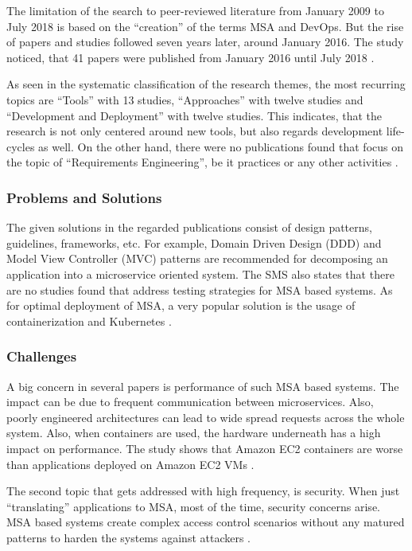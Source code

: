 The limitation of the search to peer-reviewed literature from January 2009 to
July 2018 is based on the ``creation'' of the terms MSA and DevOps.
But the rise of papers and studies followed seven years later, around January 2016.
The study noticed, that 41 papers were published from January 2016 until July 2018
\cite{waseem:SMSMSADevOps}.

As seen in the systematic classification of the research themes, the most recurring
topics are ``Tools'' with 13 studies, ``Approaches'' with twelve studies and
``Development and Deployment'' with twelve studies. This indicates, that the research
is not only centered around new tools, but also regards development life-cycles
as well. On the other hand, there were no publications found that focus on
the topic of ``Requirements Engineering'', be it practices or any other
activities \cite{waseem:SMSMSADevOps}.

\subsubsection{Problems and Solutions}

The given solutions in the regarded publications consist of
design patterns, guidelines, frameworks, etc. For example,
Domain Driven Design (DDD) and Model View Controller (MVC) patterns
are recommended for decomposing an application into a microservice oriented
system. The SMS also states that there are no studies found that
address testing strategies for MSA based systems. As for optimal deployment
of MSA, a very popular solution is the usage of containerization and Kubernetes
\cite{waseem:SMSMSADevOps}.

\subsubsection{Challenges}

A big concern in several papers is performance of such MSA based systems.
The impact can be due to frequent communication between microservices.
Also, poorly engineered architectures can lead to wide spread requests
across the whole system. Also, when containers are used, the hardware underneath
has a high impact on performance. The study shows that Amazon EC2 containers are
worse than applications deployed on Amazon EC2 VMs \cite{waseem:SMSMSADevOps}.

The second topic that gets addressed with high frequency, is security. When just ``translating''
applications to MSA, most of the time, security concerns arise. MSA based systems
create complex access control scenarios without any matured patterns to harden
the systems against attackers \cite{waseem:SMSMSADevOps}.

